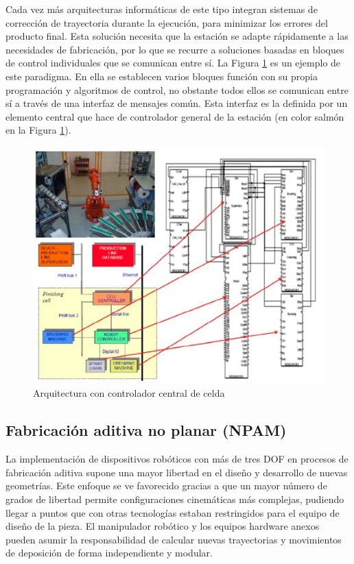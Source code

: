 Cada vez más arquitecturas informáticas de este tipo integran sistemas de corrección de trayectoria durante la ejecución, para minimizar los errores del producto final. Esta solución necesita que la estación se adapte rápidamente a las necesidades de fabricación, por lo que se recurre a soluciones basadas en bloques de control individuales que se comunican entre sí. La Figura \ref{fig:arquitectura_controlador_celda} es un ejemplo de este paradigma. En ella se establecen varios bloques función con su propia programación y algoritmos de control, no obstante todos ellos se comunican entre sí a través de una interfaz de mensajes común. Esta interfaz es la definida por un elemento central que hace de controlador general de la estación (en color salmón en la Figura \ref{fig:arquitectura_controlador_celda}).

\begin{figure}[h!]
    \centering
    \includegraphics[scale=0.5]{figuras/arquitectura_controlador_celda.jpg}
    \caption{Arquitectura con controlador central de celda \cite{Verl_2019}}
    \label{fig:arquitectura_controlador_celda}
\end{figure}


\subsection{Fabricación aditiva no planar (\acrshort{NPAM})}
La implementación de dispositivos robóticos con más de tres \acrshort{DOF} en procesos de fabricación aditiva  supone una mayor libertad en el diseño y desarrollo de nuevas geometrías. Este enfoque se ve favorecido gracias a que un mayor número de grados de libertad permite configuraciones cinemáticas más complejas, pudiendo llegar a puntos que con otras tecnologías estaban restringidos para el equipo de diseño de la pieza. El manipulador robótico y los equipos hardware anexos pueden asumir la responsabilidad de calcular nuevas trayectorias y movimientos de deposición de forma independiente y modular.

